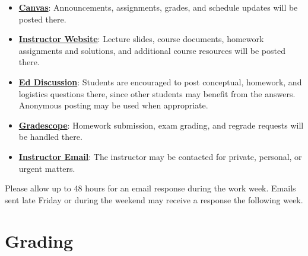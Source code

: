 \documentclass[11pt]{article}
\begin{document}
\begin{itemize}[leftmargin=*]

\item \href{https://canvas.uw.edu/courses/1896341}{\textbf{Canvas}}: Announcements, assignments, grades, and schedule updates will be posted there.

\item \href{https://armanjg.github.io/MATH-394-Probability-1-v2/}{\textbf{Instructor Website}}: Lecture slides, course documents, homework assignments and solutions, and additional course resources will be posted there.

\item \href{https://edstem.org/}{\textbf{Ed Discussion}}: Students are encouraged to post conceptual, homework, and logistics questions there, since other students may benefit from the answers. Anonymous posting may be used when appropriate.

\item \href{https://www.gradescope.com/courses/1317439}{\textbf{Gradescope}}: Homework submission, exam grading, and regrade requests will be handled there.

\item \href{mailto:armanjg@uw.edu}{\textbf{Instructor Email}}: The instructor may be contacted for private, personal, or urgent matters.

\end{itemize}








Please allow up to 48 hours for an email response during the work week. Emails sent late Friday or during the weekend may receive a response the following week.

\section{Grading}
\end{document}
